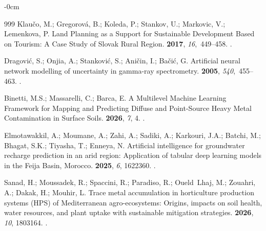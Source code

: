 \documentclass[environremediat,article,accept,pdftex,oneauthor]{Definitions/mdpi}
\begin{document}
\begin{adjustwidth}{-\extralength}{0cm}
\begin{thebibliography}{999}
Klau\v{c}o, M.; Gregorov{\'a}, B.; Koleda, P.; Stankov, U.; Markovic, V.;
  Lemenkova, P.
\newblock Land Planning as a Support for Sustainable Development Based on
  Tourism: A Case Study of Slovak Rural Region.
 {\bf 2017},
  {\em 16},~449--458.
.

Dragovi{\'c}, S.; Onjia, A.; Stankovi{\'c}, S.; Ani{\v c}in, I.; Ba{\v
  c}i{\'c}, G.
\newblock Artificial neural network modelling of uncertainty in gamma-ray
  spectrometry.
 {\bf 2005},
  {\em 540},~455--463.
.

Binetti, M.S.; Massarelli, C.; Barca, E.
\newblock A Multilevel Machine Learning Framework for Mapping and Predicting
  Diffuse and Point-Source Heavy Metal Contamination in Surface Soils.
 {\bf 2026}, {\em 7}, 4.
.

Elmotawakkil, A.; Moumane, A.; Zahi, A.; Sadiki, A.; Karkouri, J.A.; Batchi,
  M.; Bhagat, S.K.; Tiyasha, T.; Enneya, N.
\newblock Artificial intelligence for groundwater recharge prediction in an
  arid region: Application of tabular deep learning models in the Feija Basin,
  Morocco.
 {\bf 2025}, {\em 6}, 1622360.
.

Sanad, H.; Moussadek, R.; Spaccini, R.; Paradiso, R.; Oueld~Lhaj, M.; Zouahri,
  A.; Dakak, H.; Mouhir, L.
\newblock Trace metal accumulation in horticulture production systems (HPS) of
  Mediterranean agro-ecosystems: Origins, impacts on soil health, water
  resources, and plant uptake with sustainable mitigation strategies.
 {\bf 2026}, {\em 10}, 1803164.
.


\end{thebibliography}
\end{adjustwidth}
\end{document}
